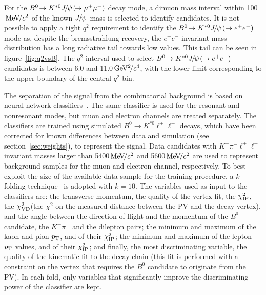 \documentclass[12pt,a4paper]{article}
\def\Ppi         {\ensuremath{\uppi}\xspace}
\def\Ppsi        {\ensuremath{\uppsi}\xspace}
\def\PB      {\ensuremath{\mathrm{B}}\xspace}
\def\PJ      {\ensuremath{\mathrm{J}}\xspace}
\def\PK      {\ensuremath{\mathrm{K}}\xspace}
\def\Pe      {\ensuremath{\mathrm{e}}\xspace}
\def\Ppi         {\ensuremath{\pi}\xspace}
\def\Ppsi        {\ensuremath{\psi}\xspace}
\def\PB      {\ensuremath{B}\xspace}
\def\PJ      {\ensuremath{J}\xspace}
\def\PK      {\ensuremath{K}\xspace}
\def\Pe      {\ensuremath{e}\xspace}
\def\epem       {\ensuremath{\Pe^+\Pe^-}\xspace}
\def\ellm       {\ensuremath{\ell^-}\xspace}
\def\ellp       {\ensuremath{\ell^+}\xspace}
\def\pion  {\ensuremath{\Ppi}\xspace}
\def\pim   {\ensuremath{\pion^-}\xspace}
\def\kaon  {\ensuremath{\PK}\xspace}
\def\Kp    {\ensuremath{\kaon^+}\xspace}
\def\Kstarz  {\ensuremath{\kaon^{*0}}\xspace}
\def\B       {\ensuremath{\PB}\xspace}
\def\Bz      {\ensuremath{\B^0}\xspace}
\def\Bd      {\ensuremath{\B^0}\xspace}
\def\jpsi     {\ensuremath{{\PJ\mskip -3mu/\mskip -2mu\Ppsi\mskip 2mu}}\xspace}
\newcommand{\decay}[2]{\ensuremath{#1\!\to #2}\xspace}         \def\ra                 {\ensuremath{\rightarrow}\xspace}
\def\to                 {\ensuremath{\rightarrow}\xspace}
\def\qsq       {\ensuremath{q^2}\xspace}
\newcommand{\gevgevcccc}{\ensuremath{{\mathrm{\,Ge\kern -0.1em V^2\!/}c^4}}\xspace}
\newcommand{\mevcc}{\ensuremath{{\mathrm{\,Me\kern -0.1em V\!/}c^2}}\xspace}
\newcommand{\chisq}{\ensuremath{\chi^2}\xspace}
\newcommand{\chisqip}{\ensuremath{\chi^2_{\rm IP}}\xspace}
\def\pt         {\mbox{$p_{\rm T}$}\xspace}
\def\cqsq{central-\qsq}
\def\chisqfd{\ensuremath{\chi^2_{\rm VD}}\xspace}
\def\KPi{\ensuremath{\Kp\pim}\xspace}
\def\KPill{\ensuremath{\KPi\ellell}\xspace}
\def\ll{\ensuremath{\ellp\ellm}\xspace}
\def\ellell{\ensuremath{\ellp\ellm}\xspace}
\def\BdToKstll{\mbox{\decay{\Bd}{\Kstarz \ll}}\xspace}
\def\BdToKstJPsmm{\mbox{\decay{\Bd}{\Kstarz \jpsi(\decay{}{\mumu})}}\xspace}
\def\BdToKstJPsee{\mbox{\decay{\Bd}{\Kstarz \jpsi(\to\epem)}}\xspace}
\begin{document}
For the \BdToKstJPsmm decay mode, a dimuon mass interval within 100\mevcc of the known \jpsi mass is selected to identify candidates. 
It is not possible to apply a tight \qsq requirement to identify the \BdToKstJPsee mode as, despite the bremsstrahlung recovery, the \epem invariant mass distribution has a long radiative tail towards low values.
This tail can be seen in figure~\ref{fig:q2vsB}.
The \qsq interval used to select \BdToKstJPsee candidates is between 6.0 and 11.0\gevgevcccc, with the lower limit corresponding to the upper boundary of the \cqsq bin.

The separation of the signal from the combinatorial background is based on neural-network classifiers~\cite{Feindt:2006pm}.
The same classifier is used for the resonant and nonresonant modes, but muon and electron channels are treated separately.
The classifiers are trained using simulated \BdToKstll decays, which have been corrected for known differences between data and simulation (see section~\ref{sec:weights}), to represent the signal.
Data candidates with \KPill invariant masses larger than 5400\mevcc and 5600\mevcc are used to represent background samples for the muon and electron channel, respectively. 
To best exploit the size of the available data sample for the training procedure, a $k$-folding technique~\cite{Blum:1999:BHB:307400.307439} is adopted with $k=10$.
The variables used as input to the classifiers are: the transverse momentum, the quality of the vertex fit, the \chisqip, the \chisqfd (the \chisq on the measured distance between the PV and the decay vertex), and the angle between the direction of flight and the momentum of the \Bz candidate, the \KPi and the dilepton pairs;
the minimum and maximum of the kaon and pion \pt, and of their \chisqip;
the minimum and maximum of the lepton \pt values, and of their \chisqip;
and finally, the most discriminating variable, the quality of the kinematic fit to the decay chain (this fit is performed with a constraint on the vertex that requires the \Bz candidate to originate from the PV).
In each fold, only variables that significantly improve the discriminating power of the classifier are kept.
\end{document}
